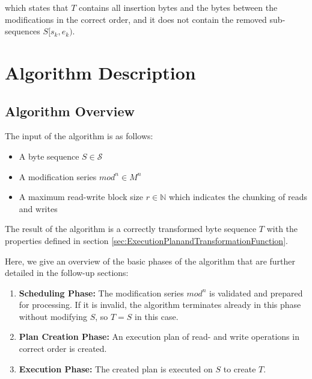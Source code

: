 \documentclass[english, 10pt, openright, twocolumn, landscape, twoside, notitlepage, a4paper, pdftex]		
{article}
\begin{document}
which states that $T$ contains all insertion bytes and the bytes between the modifications in the correct order, and it does not contain the removed sub-sequences $S[s_{k},e_{k})$.

\section{Algorithm Description}%
\label{sec:AlgorithmDescription}%

\subsection{Algorithm Overview}%
\label{sec:AlgorithmOverview}%

The input of the algorithm is as follows:
\begin{itemize}
\item A byte sequence $S\in\mathcal{S}$
\item A modification series $mod^{n}\in M^{n}$
\item A maximum read-write block size $r\in\mathbb{N}$ which indicates the chunking of reads and writes
\end{itemize}

The result of the algorithm is a correctly transformed byte sequence $T$ with the properties defined in section \ref{sec:ExecutionPlanandTransformationFunction}.

Here, we give an overview of the basic phases of the algorithm that are further detailed in the follow-up sections:
\begin{enumerate}
\item \textbf{Scheduling Phase:} The modification series $mod^{n}$ is validated and prepared for processing. If it is invalid, the algorithm terminates already in this phase without modifying $S$, so $T=S$ in this case.
\item \textbf{Plan Creation Phase:} An execution plan of read- and write operations in correct order is created.
\item \textbf{Execution Phase:} The created plan is executed on $S$ to create $T$.
\end{enumerate}
\end{document}
